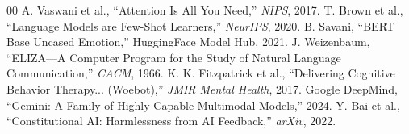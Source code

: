 \documentclass[conference]{IEEEtran}
\begin{document}
\begin{thebibliography}{00}
 A. Vaswani et al., ``Attention Is All You Need,'' \textit{NIPS}, 2017.
 T. Brown et al., ``Language Models are Few-Shot Learners,'' \textit{NeurIPS}, 2020.
 B. Savani, ``BERT Base Uncased Emotion,'' HuggingFace Model Hub, 2021.
 J. Weizenbaum, ``ELIZA---A Computer Program for the Study of Natural Language Communication,'' \textit{CACM}, 1966.
 K. K. Fitzpatrick et al., ``Delivering Cognitive Behavior Therapy... (Woebot),'' \textit{JMIR Mental Health}, 2017.
 Google DeepMind, ``Gemini: A Family of Highly Capable Multimodal Models,'' 2024.
 Y. Bai et al., ``Constitutional AI: Harmlessness from AI Feedback,'' \textit{arXiv}, 2022.
\end{thebibliography}
\end{document}
